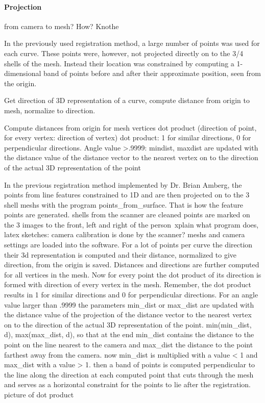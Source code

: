 \paragraph{Projection}
from camera to mesh? How? Knothe

In the previously used registration method, a large number of points was used for each curve. These points were, however, not projected directly on to the 3/4 shells of the mesh. Instead their location was constrained by computing a 1-dimensional band of points before and after their approximate position, seen from the origin.

Get direction of 3D representation of a curve, compute distance from origin to mesh, normalize to direction.

Compute distances from origin for mesh vertices
dot product (direction of point, for every vertex: direction of vertex) 
dot product: 1 for similar directions, 0 for perpendicular directions.
Angle value >.9999: mindist, maxdist are updated with the distance value of the distance vector to the nearest vertex on to the direction of the actual 3D representation of the point

In the previous registration method implemented by Dr. Brian Amberg, the
points from line features constrained to 1D
and are then projected on to the 3 shell meshs with the program points\_from\_surface. That is how the feature points are generated.
shells from the scanner are cleaned
points are marked on the 3 images to the front, left and right of the person\
xplain what program does, latex sketches:
camera calibration is done by the scanner?
meshs and camera settings are loaded into the software. For a lot of points per curve the direction their 3d representation is computed and their distance, normalized to give direction,  from the origin is saved. Distances and directions are further computed for all vertices in the mesh. Now for every point the dot product of its direction is formed with direction of every vertex in the mesh. Remember, the dot product results in 1 for similar directions and 0 for perpendicular directions.
For an angle value larger than .9999 the parameters min\_dist or max\_dist are updated with the distance value of the projection of the distance vector to the nearest vertex on to the direction of the actual 3D representation of the point. min(min\_dist, d), max(max\_dist, d), so that at the end min\_dist contains the distance to the point on the line nearest to the camera and max\_dist the distance to the point farthest away from the camera. now min\_dist is multiplied with a value < 1 and
max\_dist with a value > 1. 
then a band of points is computed perpendicular to the line along the direction at each computed point that cuts through the mesh and serves as a horizontal constraint for the points to lie after the registration.
picture of dot product

